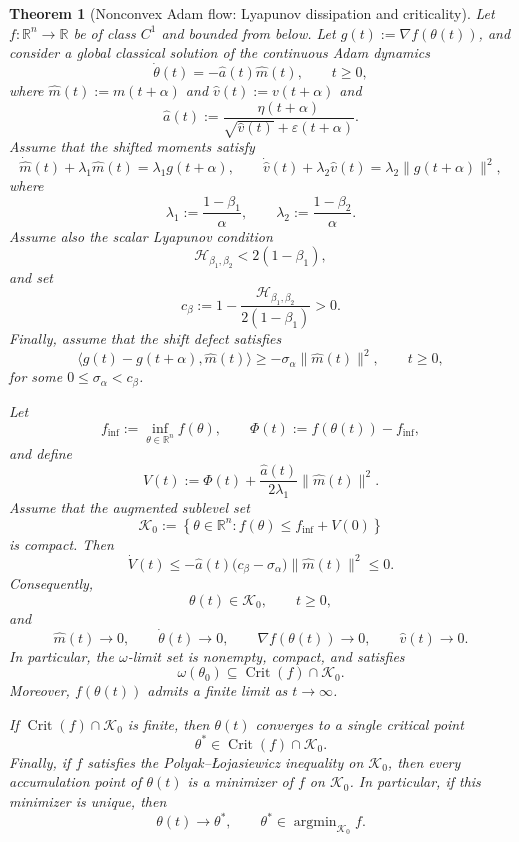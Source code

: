 \documentclass{article} %
\newtheorem{theorem}{Theorem}
\begin{document}
\begin{theorem}[Nonconvex Adam flow: Lyapunov dissipation and criticality]
\label{thm:nonconvex_adam_shifted}
Let \(f:\mathbb R^n\to\mathbb R\) be of class \(C^1\) and bounded from below. Let $g(t):=\nabla f(\theta(t))$, and consider a global classical solution of the continuous Adam dynamics
\[
    \dot\theta(t)
    =
    -
    \widehat a(t)\widehat m(t),
    \qquad t\geq0,
\]
where $\widehat m(t):=m(t+\alpha)$ and $\widehat v(t):=v(t+\alpha)$ and
\[
    \widehat a(t)
    :=
    \frac{\eta(t+\alpha)}
    {\sqrt{\widehat v(t)}+\varepsilon(t+\alpha)}.
\]
Assume that the shifted moments satisfy
\[
    \dot{\widehat m}(t)+\lambda_1\widehat m(t)
    =
    \lambda_1 g(t+\alpha),
    \qquad
    \dot{\widehat v}(t)+\lambda_2\widehat v(t)
    =
    \lambda_2\|g(t+\alpha)\|^2,
\]
where
\[
    \lambda_1:=\frac{1-\beta_1}{\alpha},
    \qquad
    \lambda_2:=\frac{1-\beta_2}{\alpha}.
\]
Assume also the scalar Lyapunov condition
\[
    \mathcal H_{\beta_1,\beta_2}<2(1-\beta_1),
\]
and set
\[
    c_\beta
    :=
    1-
    \frac{\mathcal H_{\beta_1,\beta_2}}
    {2(1-\beta_1)}
    >0.
\]
Finally, assume that the shift defect satisfies
\[
    \bigl\langle g(t)-g(t+\alpha),\widehat m(t)\bigr\rangle
    \geq
    -\sigma_\alpha\|\widehat m(t)\|^2,
    \qquad t\geq0,
\]
for some \(0\leq\sigma_\alpha<c_\beta\).

Let
\[
    f_{\inf}:=\inf_{\theta\in\mathbb R^n}f(\theta),
    \qquad
    \Phi(t):=f(\theta(t))-f_{\inf},
\]
and define
\[
    V(t)
    :=
    \Phi(t)
    +
    \frac{\widehat a(t)}{2\lambda_1}
    \|\widehat m(t)\|^2.
\]
Assume that the augmented sublevel set
\[
    \mathcal K_0
    :=
    \left\{
        \theta\in\mathbb R^n:
        f(\theta)\leq f_{\inf}+V(0)
    \right\}
\]
is compact. Then
\[
    \dot V(t)
    \leq
    -
    \widehat a(t)
    \bigl(c_\beta-\sigma_\alpha\bigr)
    \|\widehat m(t)\|^2
    \leq0.
\]
Consequently,
\[
    \theta(t)\in\mathcal K_0,
    \qquad t\geq0,
\]
and
\[
    \widehat m(t)\to0,
    \qquad
    \dot\theta(t)\to0,
    \qquad
    \nabla f(\theta(t))\to0,
    \qquad
    \widehat v(t)\to0.
\]
In particular, the \(\omega\)-limit set is nonempty, compact, and satisfies
\[
    \omega(\theta_0)
    \subseteq
    \operatorname{Crit}(f)\cap\mathcal K_0.
\]
Moreover, \(f(\theta(t))\) admits a finite limit as \(t\to\infty\).

If \(\operatorname{Crit}(f)\cap\mathcal K_0\) is finite, then \(\theta(t)\) converges to a single critical point
\[
    \theta^*\in\operatorname{Crit}(f)\cap\mathcal K_0.
\]
Finally, if \(f\) satisfies the Polyak--{\L}ojasiewicz inequality on \(\mathcal K_0\), then every accumulation point of \(\theta(t)\) is a minimizer of \(f\) on \(\mathcal K_0\). In particular, if this minimizer is unique, then
\[
    \theta(t)\to\theta^*,
    \qquad
    \theta^*\in\operatorname{argmin}_{\mathcal K_0}f.
\]
\end{theorem}
\end{document}
